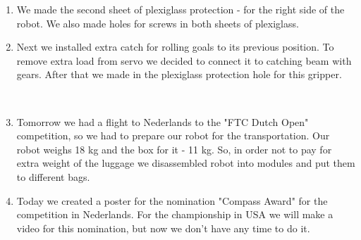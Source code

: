 \begin{enumerate}
\begin{enumerate}
	   \item We made the second sheet of plexiglass protection - for the right side of the robot. We also made holes for screws in both sheets of plexiglass.
	   
	   \item Next we installed extra catch for rolling goals to its previous position. To remove extra load from servo we decided to connect it to catching beam with gears. After that we made in the plexiglass protection hole for this gripper.
	   \begin{figure}[H]
	   	\begin{minipage}[h]{0.2\linewidth}
	   		\center  
	   	\end{minipage}
	   	\begin{minipage}[h]{0.6\linewidth}
	   		\caption{}
	   	\end{minipage}
	   \end{figure}
	   
	   \item Tomorrow we had a flight to Nederlands to the "FTC Dutch Open" competition, so we had to prepare our robot for the transportation. Our robot weighs 18 kg and the box for it - 11 kg. So, in order not to pay for extra weight of the luggage we disassembled robot into modules and put them to different bags.
	   
	   \item Today we created a poster for the nomination "Compass Award" for the competition in Nederlands. For the championship in USA we will make a video for this nomination, but now we don't have any time to do it.
	   

\end{enumerate}
\end{enumerate}
